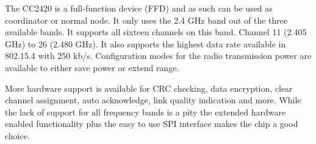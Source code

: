 The CC2420 is a full-function device (FFD) and as such can be used as
coordinator or normal node. It only uses the 2.4 GHz band out of the three
available bands. It supports all sixteen channels on this band. Channel 11
(2.405 GHz) to 26 (2.480 GHz). It also supports the highest data rate available
in 802.15.4 with 250 kb/s. Configuration modes for the radio transmission power
are available to either save power or extend range.

More hardware support is available for CRC checking, data encryption, clear
channel assignment, auto acknowledge, link quality indication and more. While
the lack of support for all frequency bands is a pity the extended hardware
enabled functionality plus the easy to use SPI interface makes the chip a good
choice.
